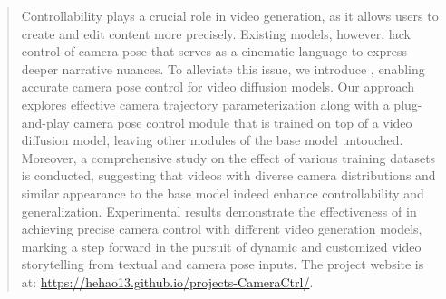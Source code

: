 \begin{abstract}
Controllability plays a crucial role in video generation, as it allows users to create and edit content more precisely. 
%
Existing models, however, lack control of camera pose that serves as a cinematic language to express deeper narrative nuances. 
%
To alleviate this issue, we introduce \method, enabling accurate camera pose control for video diffusion models. 
%
Our approach explores effective camera trajectory parameterization along with a plug-and-play camera pose control module that is trained on top of a video diffusion model, leaving other modules of the base model untouched. 
%
Moreover, a comprehensive study on the effect of various training datasets is conducted, suggesting that videos with diverse camera distributions and similar appearance to the base model indeed enhance controllability and generalization. 
%
Experimental results demonstrate the effectiveness of \method in achieving precise camera control with different video generation models, marking a step forward in the pursuit of dynamic and customized video storytelling from textual and camera pose inputs.
%
The project website is at: \url{https://hehao13.github.io/projects-CameraCtrl/}.
\end{abstract}